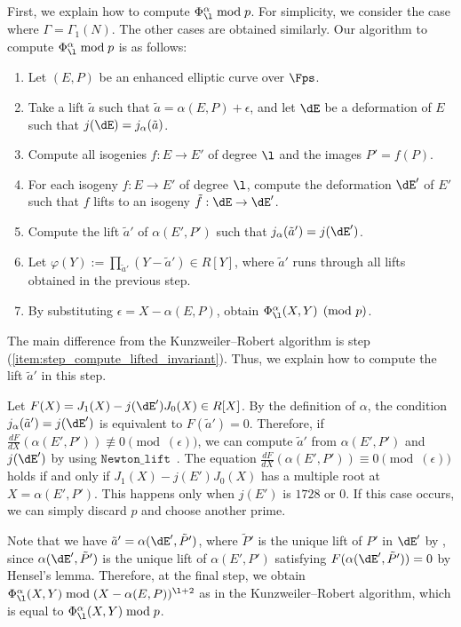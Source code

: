\documentclass{amsart}
\theoremstyle{definition}
\theoremstyle{remark}
\numberwithin{equation}{section}
\begin{document}
First, we explain how to compute $\Phi_{\l}^{\alpha} \bmod p$.
For simplicity,
we consider the case where $\Gamma=\Gamma_1(N)$.
The other cases are obtained similarly.
Our algorithm to compute $\Phi_{\l}^{\alpha} \bmod p$ is as follows:
\begin{enumerate}
    \item Let $(E, P)$ be an enhanced elliptic curve over $\Fps$.
    \item Take a lift $\tilde{a}$ such that $\tilde{a} = \alpha(E, P) + \epsilon$,
        and let $\dE$ be a deformation of $E$ such that $j(\dE) = j_{ \alpha }(\tilde{a})$.
    \item Compute all isogenies $f:E\to E'$ of degree $\l$ and the images $P'=f(P)$.
    \item For each isogeny $f:E\to E'$ of degree $\l$,
        compute the deformation $\dE'$ of $E'$ such that $f$ lifts to an isogeny $\tilde{f}:\dE\to \dE'$.
    \item Compute the lift $\tilde{a}'$ of $\alpha(E', P')$ such that $j_{\alpha}(\tilde{a}') = j(\dE')$.
        \label{item:step_compute_lifted_invariant}
    \item Let $\varphi(Y):=\prod_{\tilde{a}'}(Y - \tilde{a}')\in R[Y]$, where $\tilde{a}'$
        runs through all lifts obtained in the previous step.
    \item By substituting $\epsilon= X - \alpha(E,P)$, obtain $\Phi_{\l}^\alpha(X,Y) \pmod p$.
\end{enumerate}
The main difference from the Kunzweiler--Robert algorithm
is step (\ref{item:step_compute_lifted_invariant}).
Thus, we explain how to compute the lift $\tilde{a}'$ in this step.

Let $F(X) = J_1(X) - j(\dE') J_0(X) \in R[X]$.
By the definition of $\alpha$,
the condition $j_{\alpha}(\tilde{a}') = j(\dE')$
is equivalent to $F(\tilde{a}') = 0$.
Therefore, if $\frac{d F}{d X}(\alpha(E', P')) \not\equiv 0 \pmod{(\epsilon)}$,
we can compute $\tilde{a}'$ from $\alpha(E', P')$ and $j(\dE')$
by using $\mathtt{Newton\_lift}$~\cite[Algorithm 1]{deformation_Kunzweiler_2024}. 
The equation $\frac{d F}{d X}(\alpha(E', P')) \equiv 0 \pmod{(\epsilon)}$ holds
if and only if $J_1(X) - j(E') J_0(X)$ has a multiple root at $X = \alpha(E', P')$.
This happens only when $j(E')$ is $1728$ or $0$.
If this case occurs, we can simply discard $p$ and choose another prime.

Note that we have $\tilde{a}' = \alpha(\dE', \tilde{P}')$,
where $\tilde{P}'$ is the unique lift of $P'$ in $\dE'$ by ,
since $\alpha(\dE', \tilde{P}')$ is the unique lift of $\alpha(E', P')$
satisfying $F(\alpha(\dE', \tilde{P}')) = 0$ by Hensel's lemma.
Therefore, at the final step,
we obtain $\Phi_{\l}^\alpha(X,Y) \bmod{(X - \alpha(E,P))^{\l+2}}$
as in the Kunzweiler--Robert algorithm,
which is equal to $\Phi_{\l}^\alpha(X,Y) \bmod p$.
\end{document}
